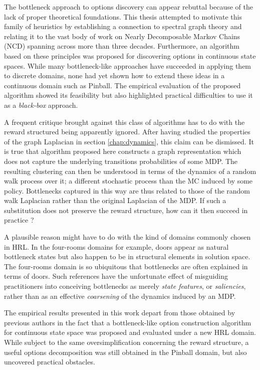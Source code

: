 The bottleneck approach to options discovery can appear rebuttal because of the lack of proper theoretical foundations. This thesis attempted to motivate this family of heuristics by establishing a connection to spectral graph theory and relating it to the vast body of work on Nearly Decomposable Markov Chains (NCD) spanning across more than three decades. Furthermore, an algorithm based on these principles was proposed for discovering options in continuous state spaces. While many bottleneck-like approaches have succeeded in applying them to discrete domains, none had yet shown how to extend these ideas in a continuous domain such as Pinball. The empirical evaluation of the proposed algorithm showed its feasibility but also highlighted practical difficulties to use it as a \textit{black-box} approach.

A frequent critique brought against this class of algorithms has to do with the reward structured being apparently ignored. After having studied the properties of the graph Laplacian in section \ref{chap:dynamics}, this claim can be dismissed. It is true that algorithm proposed here constructs a graph representation which does not capture the underlying transitions probabilities of some MDP. The resulting clustering can then be understood in terms of the dynamics of a random walk process over it; a different stochastic process than the MC induced by some policy. Bottlenecks captured in this way are thus related to those of the random walk Laplacian rather than the original Laplacian of the MDP. If such a substitution does not preserve the reward structure, how can it then succeed in practice ?

A plausible reason might have to do with the kind of domains commonly chosen in HRL. In the four-rooms domains for example, doors appear as natural bottleneck states but also happen to be in structural elements in solution space. The four-rooms domain is so ubiquitous that bottlenecks are often explained in terms of doors. Such references have the unfortunate effect of misguiding practitioners into conceiving bottlenecks as merely \textit{state features}, or \textit{saliencies}, rather than as an effective \textit{coarsening} of the dynamics induced by an MDP.

The empirical results presented in this work depart from those obtained by previous authors in the fact that a bottleneck-like option construction algorithm for continuous state space was proposed and evaluated under a new HRL domain. While subject to the same oversimplification concerning the reward structure, a useful options decomposition was still obtained in the Pinball domain, but also uncovered practical obstacles. 

